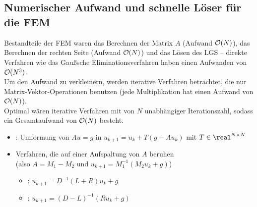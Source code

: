 \pagebreak

\subsection{%
    Numerischer Aufwand und schnelle Löser für die FEM%
}

\begin{Bem}
    Bestandteile der FEM waren
    das Berechnen der Matrix $A$ (Aufwand $\mathcal{O}(N)$),
    das Berechnen der rechten Seite (Aufwand $\mathcal{O}(N)$) und
    das Lösen des LGS --
    direkte Verfahren wie das Gaußsche Eliminationsverfahren
    haben einen Aufwanden von $\mathcal{O}(N^3)$.\\
    Um den Aufwand zu verkleinern,
    werden iterative Verfahren betrachtet, die nur
    Matrix-Vektor-Operationen benutzen
    (jede Multiplikation hat einen Aufwand von $\mathcal{O}(N)$).\\
    Optimal wären iterative Verfahren mit von $N$ unabhängiger Iterationszahl,
    sodass ein Gesamtaufwand von $\mathcal{O}(N)$ besteht.
    \begin{itemize}
        \item
        :
        Umformung von $Au = g$ in
        $u_{k+1} = u_k + T(g - Au_k)$ mit $T \in \real^{N \times N}$

        \item
        Verfahren, die auf einer Aufspaltung von $A$ beruhen\\
        (also $A = M_1 - M_2$ und $u_{k+1} = M_1^{-1} (M_2 u_k + g)$)
        \begin{itemize}
            \item
            :
            $u_{k+1} = D^{-1} (L + R) u_k + g$

            \item
            :
            $u_{k+1} = (D - L)^{-1} (Ru_k + g)$
        \end{itemize}


\end{itemize}
\end{Bem}
